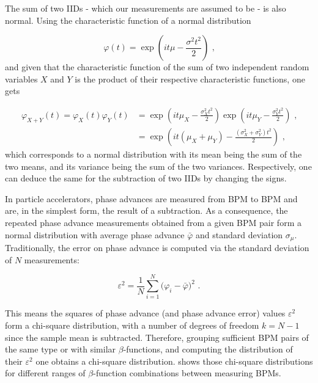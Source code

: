 The sum of two IIDs - which our measurements are assumed to be - is also normal.
Using the characteristic function of a normal distribution

\begin{equation}
    \varphi(t) = \exp \left( it \mu - \frac{\sigma^2 t^2}{2} \right) \text{ ,}
    \label{equations:normal_distribution_characteristic_function}
\end{equation}
and given that the characteristic function of the sum of two independent random variables \(X\) and \(Y\) is the product of their respective characteristic functions, one gets

\begin{equation}
    \begin{aligned}
        \varphi_{X+Y}(t) = \varphi_{X}(t) \varphi_{Y}(t) &= \exp \left( it \mu_{X} - \frac{\sigma_{X}^2 t^2}{2} \right) \exp \left(it \mu_{Y} - \frac{\sigma_{Y}^2 t^2}{2} \right)  \text{ ,} \\
                                                         &= \exp \left( it \left( \mu_{X} + \mu_{Y} \right) - \frac{\left( \sigma_{X}^2 + \sigma_{Y}^2 \right) t^2}{2} \right)  \text{ ,}
    \end{aligned}
\end{equation}
which corresponds to a normal distribution with its mean being the sum of the two means, and its variance being the sum of the two variances.
Respectively, one can deduce the same for the subtraction of two IIDs by changing the signs.

In particle accelerators, phase advances are measured from BPM to BPM and are, in the simplest form, the result of a subtraction.
As a consequence, the repeated phase advance measurements obtained from a given BPM pair form a normal distribution with average phase advance \(\bar{\varphi}\) and standard deviation \(\sigma_{\mu}\).
Traditionally, the error on phase advance is computed via the standard deviation of \(N\) measurements:

\begin{equation}
    \varepsilon^2 = \frac{1}{N} \sum_{i=1}^{N}\big(\varphi_{i} - \bar{\varphi} \big)^2 \text{ .}
    \label{equation:phase_error_calculation}
\end{equation}

This means the squares of phase advance (and phase advance error) values \(\varepsilon^2\) form a chi-square distribution, with a number of degrees of freedom  \(k = N - 1\) since the sample mean is subtracted.
Therefore, grouping sufficient BPM pairs of the same type or with similar \(\beta\)-functions, and computing the distribution of their \(\varepsilon^2\) one obtains a chi-square distribution.
 shows those chi-square distributions for different ranges of \(\beta\)-function combinations between measuring BPMs.

